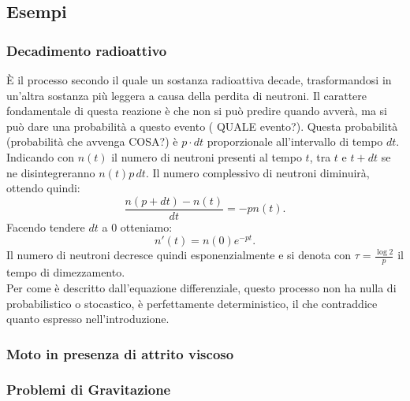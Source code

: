 \documentclass[a4paper,twoside]{article}
\theoremstyle{definition}
\numberwithin{theorem}{section}
\begin{document}
\subsection{Esempi}
\subsubsection{Decadimento radioattivo}
È il processo secondo il quale un sostanza radioattiva decade, trasformandosi in un'altra sostanza più leggera a causa della perdita di neutroni.
Il carattere fondamentale di questa reazione è che non si può predire quando avverà, ma si può dare una probabilità a questo evento ({\color{red} QUALE evento?}). Questa probabilità ({\color{red}probabilità che avvenga COSA?}) è $p\cdot dt$ proporzionale all'intervallo di tempo $dt$. Indicando con $n(t)$ il numero di neutroni presenti al tempo $t$, tra $t$ e $t+dt$ se ne disintegreranno $n(t)p\,dt$. Il numero complessivo di neutroni diminuirà, ottendo quindi:$$\frac{n(p+dt)-n(t)}{dt}=-pn(t).$$
Facendo tendere $dt$ a $0$ otteniamo: $$n'(t)=n(0)e^{-pt}.$$
Il numero di neutroni decresce quindi esponenzialmente e si denota con $\tau=\frac{\log 2}{p}$ il tempo di dimezzamento.\\
{\color{red}Per come è descritto dall'equazione differenziale, questo processo non ha nulla di probabilistico o stocastico, è perfettamente deterministico, il che contraddice quanto espresso nell'introduzione.}

\subsubsection{Moto in presenza di attrito viscoso}

\subsubsection{Problemi di Gravitazione}
\end{document}
